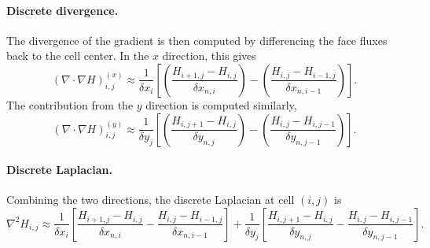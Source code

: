 \paragraph{Discrete divergence.}
The divergence of the gradient is then computed by differencing the face fluxes back to the cell center. In the $x$ direction, this gives
\begin{equation}
\left( \nabla \cdot \nabla H \right)^{(x)}_{i,j}
\approx
\frac{1}{\delta x_i}
\left[
\left( \frac{H_{i+1,j} - H_{i,j}}{\delta x_{n,i}} \right)
-
\left( \frac{H_{i,j} - H_{i-1,j}}{\delta x_{n,i-1}} \right)
\right].
\label{eq:div_x}
\end{equation}
The contribution from the $y$ direction is computed similarly,
\begin{equation}
\left( \nabla \cdot \nabla H \right)^{(y)}_{i,j}
\approx
\frac{1}{\delta y_j}
\left[
\left( \frac{H_{i,j+1} - H_{i,j}}{\delta y_{n,j}} \right)
-
\left( \frac{H_{i,j} - H_{i,j-1}}{\delta y_{n,j-1}} \right)
\right].
\label{eq:div_y}
\end{equation}

\paragraph{Discrete Laplacian.}
Combining the two directions, the discrete Laplacian at cell $(i,j)$ is
\begin{equation}
\nabla^2 H_{i,j}
\approx
\frac{1}{\delta x_i}
\left[
\frac{H_{i+1,j} - H_{i,j}}{\delta x_{n,i}}
-
\frac{H_{i,j} - H_{i-1,j}}{\delta x_{n,i-1}}
\right]
+
\frac{1}{\delta y_j}
\left[
\frac{H_{i,j+1} - H_{i,j}}{\delta y_{n,j}}
-
\frac{H_{i,j} - H_{i,j-1}}{\delta y_{n,j-1}}
\right].
\label{eq:laplacian_nonuniform}
\end{equation}


